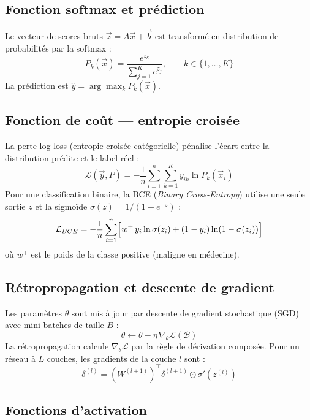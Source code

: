 \documentclass[a4paper,11pt]{article}
\begin{document}
\subsection{Fonction softmax et prédiction}

Le vecteur de scores bruts $\vec{z} = A\vec{x} + \vec{b}$ est transformé en distribution
de probabilités par la softmax :
\[
  P_k(\vec{x}) = \frac{e^{z_k}}{\displaystyle\sum_{j=1}^{K} e^{z_j}}, \qquad k \in \{1,\ldots,K\}
\]
La prédiction est $\hat{y} = \arg\max_k P_k(\vec{x})$.

\subsection{Fonction de coût — entropie croisée}

La perte log-loss (entropie croisée catégorielle) pénalise l'écart entre
la distribution prédite et le label réel :
\[
  \mathcal{L}(\vec{y}, P) = -\frac{1}{n}\sum_{i=1}^{n}\sum_{k=1}^{K}
  y_{ik}\ln P_k(\vec{x}_i)
\]
Pour une classification binaire, la BCE (\textit{Binary Cross-Entropy}) utilise
une seule sortie $z$ et la sigmoïde $\sigma(z) = 1/(1+e^{-z})$ :
\[
  \mathcal{L}_{BCE} = -\frac{1}{n}\sum_{i=1}^{n}
  \Bigl[w^+\,y_i\ln\sigma(z_i) + (1-y_i)\ln(1-\sigma(z_i))\Bigr]
\]
où $w^+$ est le poids de la classe positive (maligne en médecine).

\subsection{Rétropropagation et descente de gradient}

Les paramètres $\theta$ sont mis à jour par descente de gradient stochastique (SGD)
avec mini-batches de taille $B$ :
\[
  \theta \leftarrow \theta - \eta\,\nabla_\theta \mathcal{L}(\mathcal{B})
\]
La rétropropagation calcule $\nabla_\theta \mathcal{L}$ par la règle de dérivation composée.
Pour un réseau à $L$ couches, les gradients de la couche $l$ sont :
\[
  \delta^{(l)} = \left(W^{(l+1)}\right)^\top \delta^{(l+1)} \odot \sigma'\!\left(z^{(l)}\right)
\]

\subsection{Fonctions d'activation}
\end{document}

